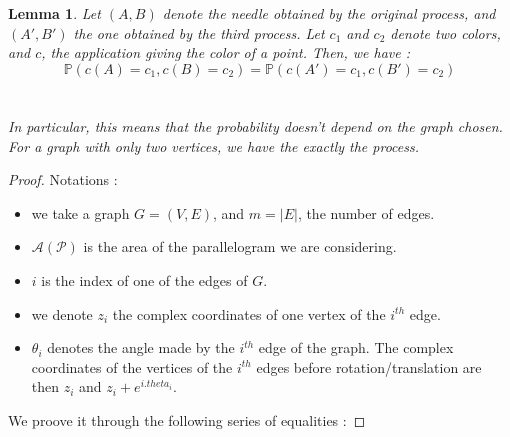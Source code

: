 \documentclass[a4paper,11pt]{article}
\newtheorem{lemma}{Lemma}
\begin{document}
\begin{lemma}
Let $(A,B)$ denote the needle obtained by the original process, and $(A',B')$ the one obtained by the third process. Let $c_1$ and $c_2$ denote two colors, and $c$, the application giving the color of a point. Then, we have :\\
 $$\mathbb{P}(c(A) = c_1 , c(B) = c_2) = \mathbb{P}(c(A') = c_1, c(B') = c_2) $$ \\
 \\
 In particular, this means that the probability doesn't depend on the graph chosen. For a graph with only two vertices, we have the exactly the process.
\end{lemma}

\begin{proof}
Notations : 
\begin{itemize}
\item we take a graph $G=(V,E)$, and $m = |E|$, the number of edges.

\item $\mathcal{A(P)}$ is the area of the parallelogram we are considering.

\item $i$ is the index of one of the edges of $G$.

\item we denote $z_i$ the complex coordinates of one vertex of the $i^{th}$ edge.

\item $\theta_i$ denotes the angle made by the $i^{th}$ edge of the graph. The complex coordinates of the vertices of the $i^{th}$ edges before rotation/translation are then $z_i $ and $z_i + e^{i.theta_i}$.

\end{itemize}


\vspace{1 cm}
We proove it through the following series of equalities :


\end{proof}
\end{document}
